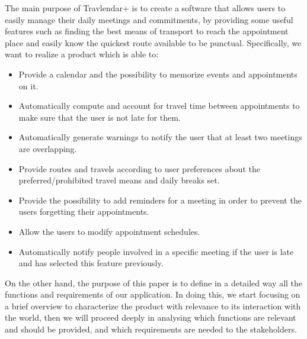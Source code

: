 The main purpose of Travlendar+ is to create a software that allows users to easily manage their daily meetings and commitments, by providing some useful features such as finding the best means of transport to reach the appointment place and easily know the quickest route available to be punctual.
Specifically, we want to realize a product which is able to:
\begin{itemize}

\item Provide a calendar and the possibility to memorize events and appointments on it.

\item Automatically compute and account for travel time between appointments to make sure that the user is not late for them.

\item Automatically generate warnings to notify the user that at least two meetings are overlapping.

\item Provide routes and travels according to user preferences about the preferred/prohibited travel means and daily breaks set.

\item Provide the possibility to add reminders for a meeting in order to prevent the users forgetting their appointments.

\item Allow the users to modify appointment schedules.

\item Automatically notify people involved in a specific meeting if the user is late and has selected this feature previously. 


\end{itemize}

On the other hand, the purpose of this paper is to define in a detailed way all the functions and requirements of our application. In doing this, we start focusing on a brief overview to characterize the product with relevance to its interaction with the world, then we will proceed deeply in analysing which functions are relevant and should be provided, and which requirements are needed to the stakeholders. 
